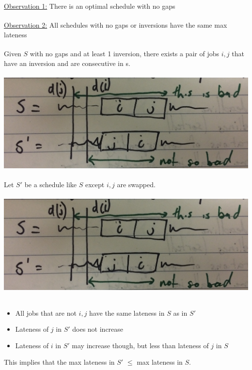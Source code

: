 \documentclass[12pt]{article}
\begin{document}
\underline{Observation 1:} There is an optimal schedule with no gaps\\
\\
\underline{Observation 2:} All schedules with no gaps or inversions have the same max lateness\\
\\
Given $S$ with no gaps and at least 1 inversion, there exists a pair of jobs $i,j$ that have an inversion and are consecutive in s.\\
\\
\includegraphics[scale=0.11]{minmax4}
\\
\\
Let $S'$ be a schedule like $S$ except $i,j$ are swapped.\\
\\
\includegraphics[scale=0.11]{minmax4}
\\
\\
\begin{itemize}
	\item{All jobs that are not $i,j$ have the same lateness in $S$ as in $S'$}
	\item{Lateness of $j$ in $S'$ does not increase}
	\item{Lateness of $i$ in $S'$ may increase though, but less than lateness of $j$ in $S$}
\end{itemize}
This implies that the max lateness in $S'$ $\leq$ max lateness in $S$.
\end{document}
